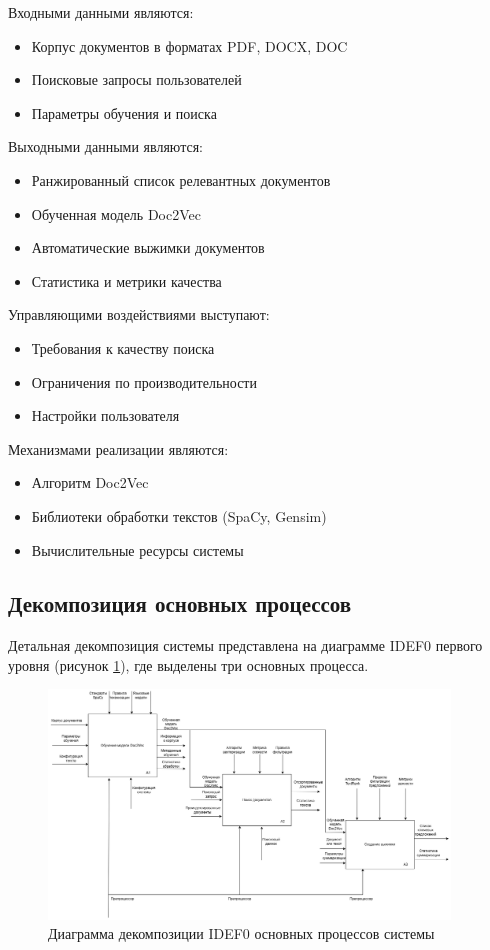 Входными данными являются:
\begin{itemize}
	\item Корпус документов в форматах PDF, DOCX, DOC
	\item Поисковые запросы пользователей
	\item Параметры обучения и поиска
\end{itemize}

Выходными данными являются:
\begin{itemize}
	\item Ранжированный список релевантных документов
	\item Обученная модель Doc2Vec
	\item Автоматические выжимки документов
	\item Статистика и метрики качества
\end{itemize}

Управляющими воздействиями выступают:
\begin{itemize}
	\item Требования к качеству поиска
	\item Ограничения по производительности
	\item Настройки пользователя
\end{itemize}

Механизмами реализации являются:
\begin{itemize}
	\item Алгоритм Doc2Vec
	\item Библиотеки обработки текстов (SpaCy, Gensim)
	\item Вычислительные ресурсы системы
\end{itemize}

\subsection{Декомпозиция основных процессов}

Детальная декомпозиция системы представлена на диаграмме IDEF0 первого уровня (рисунок \ref{idef1}), где выделены три основных процесса.

\begin{figure}[H]
	\centering
	\includegraphics[width=0.95\textwidth]{images/IDEF1.png}
	\caption{Диаграмма декомпозиции IDEF0 основных процессов системы}
	\label{idef1}
\end{figure}

